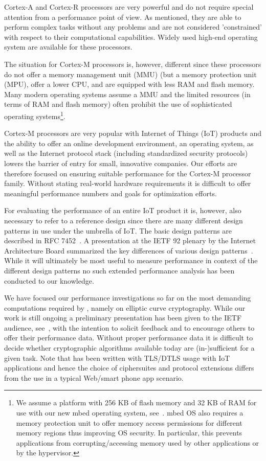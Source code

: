 \documentclass[peerreview, a4paper, draft, 7pt]{IEEEtran}
\begin{document}
Cortex-A and Cortex-R processors are very powerful and do not require special attention from a performance point of view. As mentioned, they are able to perform complex tasks without any problems and are not considered 'constrained' with respect to their computational capabilities. Widely used high-end operating system are available for these processors. 

The situation for Cortex-M processors is, however, different since these processors do not offer a memory management unit (MMU) (but a memory protection unit (MPU), offer a lower CPU, and are equipped with less RAM and flash memory. Many modern operating systems assume a MMU and the limited resources (in terms of RAM and flash memory) often prohibit the use of sophisticated operating systems\footnote{We assume a platform with 256 KB of flash memory and 32 KB of RAM for use with our new mbed operating system, see~\cite{mbed}. mbed OS also requires a memory protection unit to offer memory access permissions for different memory regions thus improving OS security. In particular, this prevents applications from corrupting/accessing memory used by other applications or by the hypervisor.}.

Cortex-M processors are very popular with Internet of Things (IoT) products and the ability to offer an online development environment, an operating system, as well as the Internet protocol stack (including standardized security protocols) lowers the barrier of entry for small, innovative companies. Our efforts are therefore focused on ensuring suitable performance for the Cortex-M processor family. Without stating real-world hardware requirements it is difficult to offer meaningful performance numbers and goals for optimization efforts.

For evaluating the performance of an entire IoT product it is, however, also necessary to refer to a reference design since there are many different design patterns in use under the umbrella of IoT. The basic design patterns are described in RFC 7452~\cite{rfc7452}. A presentation at the IETF 92 plenary by the Internet Architecture Board summarized the key differences of various design patterns~\cite{IETF92}. While it will ultimately be most useful to measure performance in context of the different design patterns no such extended performance analysis has been conducted to our knowledge. 

We have focused our performance investigations so far on the most demanding computations required by \cite{draft-ietf-dice-profile}, namely on elliptic curve cryptography. While our work is still ongoing a preliminary presentation has been given to the IETF audience, see~\cite{LWIG}, with the intention to solicit feedback and to encourage others to offer their performance data. Without proper performance data it is difficult to decide whether cryptographic algorithms available today are (in-)sufficient for a given task. Note that \cite{draft-ietf-dice-profile} has been written with TLS/DTLS usage with IoT applications and hence the choice of ciphersuites and protocol extensions differs from the use in a typical Web/smart phone app scenario. 
\end{document}
